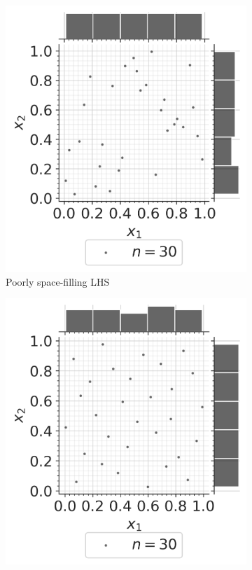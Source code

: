 \begin{figure}[ht]
    \centering
    \begin{subfigure}[b]{0.32\textwidth}
        \centering
        \includegraphics[width=\textwidth]{../numerical_experiments/chapter1/figures/poor_LHS.png}
        \caption{Poorly space-filling LHS}
    \end{subfigure}
    \hfill
    \begin{subfigure}[b]{0.32\textwidth}
        \centering
        \includegraphics[width=\textwidth]{../numerical_experiments/chapter1/figures/optimized_C2_LHS.png}

\end{subfigure}
\end{figure}
